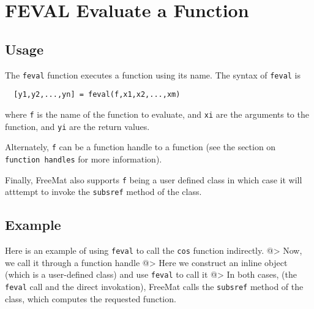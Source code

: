 \section{FEVAL Evaluate a Function}

\subsection{Usage}

The \verb|feval| function executes a function using its name.
The syntax of \verb|feval| is
\begin{verbatim}
  [y1,y2,...,yn] = feval(f,x1,x2,...,xm)
\end{verbatim}
where \verb|f| is the name of the function to evaluate, and
\verb|xi| are the arguments to the function, and \verb|yi| are the
return values.

Alternately, \verb|f| can be a function handle to a function
(see the section on \verb|function handles| for more information).

Finally, FreeMat also supports \verb|f| being a user defined class
in which case it will atttempt to invoke the \verb|subsref| method
of the class.
\subsection{Example}

Here is an example of using \verb|feval| to call the \verb|cos| 
function indirectly.
@>
Now, we call it through a function handle
@>
Here we construct an inline object (which is a user-defined class)
and use \verb|feval| to call it
@>
In both cases, (the \verb|feval| call and the direct invokation), FreeMat
calls the \verb|subsref| method of the class, which computes the requested 
function.
